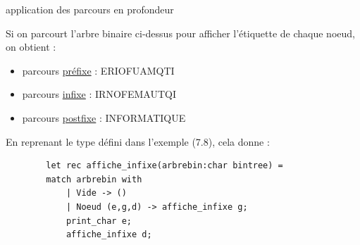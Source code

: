\begin{exemple}{7.16}{application des parcours en profondeur}
    \begin{center}
\end{center}
    Si on parcourt l'arbre binaire ci-dessus pour afficher l'étiquette de chaque noeud, on obtient : \begin{itemize}
        \item parcours \underline{préfixe} : ERIOFUAMQTI
        \item parcours \underline{infixe} : IRNOFEMAUTQI
        \item parcours \underline{postfixe} : INFORMATIQUE
    \end{itemize}
    En reprenant le type défini dans l'exemple (7.8), cela donne :
    \begin{verbatim}
        let rec affiche_infixe(arbrebin:char bintree) =
        match arbrebin with
            | Vide -> ()
            | Noeud (e,g,d) -> affiche_infixe g;
            print_char e;
            affiche_infixe d;
    \end{verbatim}
\end{exemple}

